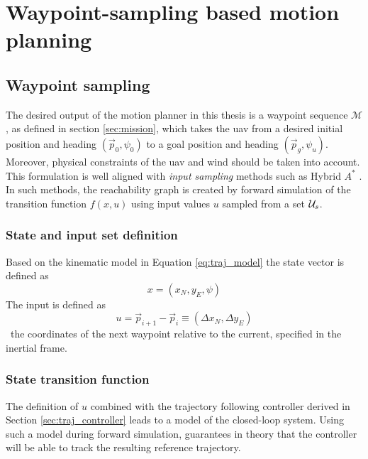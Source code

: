\chapter{Waypoint-sampling based motion planning}\label{cha:motion_planning_fw}
\section{Waypoint sampling}
The desired output of the motion planner in this thesis is a waypoint sequence $\mathcal{M}$, as defined in section \ref{sec:mission},
which takes the \ac{uav} from a desired initial position and heading $(\vec{p}_0,\psi_0)$ to a goal position and heading $(\vec{p}_g,\psi_u)$. Moreover, physical constraints of the \ac{uav} and wind should be taken into account. This formulation is well aligned with \textit{input sampling} methods such as Hybrid $A^*$ \cite{hybrid_astar}. 
In such methods, the reachability graph is created by forward simulation of the transition function $f(x, u)$ using input values $u$ sampled from a 
set $\mathcal{U}_s$. 

\subsection{State and input set definition}
Based on the kinematic model in Equation \eqref{eq:traj_model} the state vector is defined as
\begin{equation}
    x=(x_N, y_E, \psi)
\end{equation}
The input is defined as 
\begin{equation}
    u=\vec{p}_{i+1}-\vec{p}_i\equiv(\Delta x_N, \Delta y_E)
\end{equation}
\ie\ the coordinates of the next waypoint relative to the current, specified in the inertial frame.
\subsection{State transition function}
The definition of $u$ combined with the trajectory following controller derived in Section \ref{sec:traj_controller} 
leads to a model of the closed-loop system. Using such a model during forward simulation, 
guarantees in theory that the controller will be able to track the resulting reference trajectory. 

